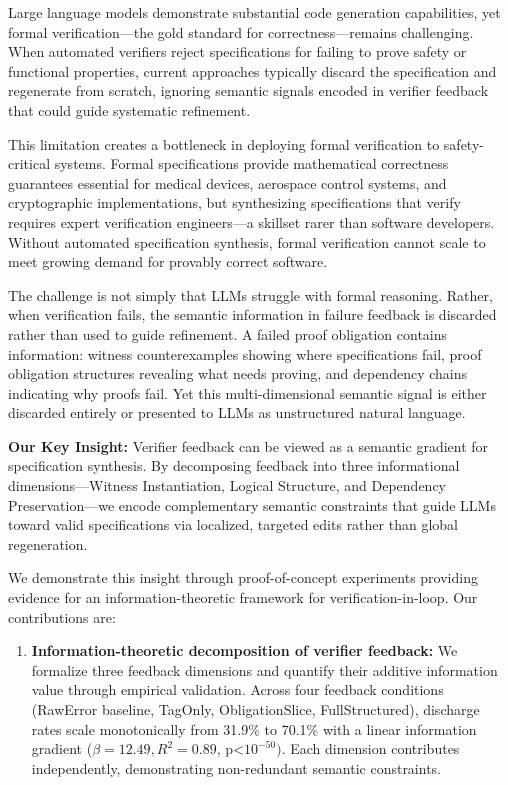 
Large language models demonstrate substantial code generation capabilities, yet formal verification---the gold standard for correctness---remains challenging. When automated verifiers reject specifications for failing to prove safety or functional properties, current approaches typically discard the specification and regenerate from scratch, ignoring semantic signals encoded in verifier feedback that could guide systematic refinement.

This limitation creates a bottleneck in deploying formal verification to safety-critical systems. Formal specifications provide mathematical correctness guarantees essential for medical devices, aerospace control systems, and cryptographic implementations, but synthesizing specifications that verify requires expert verification engineers---a skillset rarer than software developers. Without automated specification synthesis, formal verification cannot scale to meet growing demand for provably correct software.

The challenge is not simply that LLMs struggle with formal reasoning. Rather, when verification fails, the semantic information in failure feedback is discarded rather than used to guide refinement. A failed proof obligation contains information: witness counterexamples showing where specifications fail, proof obligation structures revealing what needs proving, and dependency chains indicating why proofs fail. Yet this multi-dimensional semantic signal is either discarded entirely or presented to LLMs as unstructured natural language.

\textbf{Our Key Insight:} Verifier feedback can be viewed as a semantic gradient for specification synthesis. By decomposing feedback into three informational dimensions---Witness Instantiation, Logical Structure, and Dependency Preservation---we encode complementary semantic constraints that guide LLMs toward valid specifications via localized, targeted edits rather than global regeneration.

We demonstrate this insight through proof-of-concept experiments providing evidence for an information-theoretic framework for verification-in-loop. Our contributions are:

\begin{enumerate}
\item \textbf{Information-theoretic decomposition of verifier feedback:} We formalize three feedback dimensions and quantify their additive information value through empirical validation. Across four feedback conditions (RawError baseline, TagOnly, ObligationSlice, FullStructured), discharge rates scale monotonically from 31.9\% to 70.1\% with a linear information gradient ($\beta =12.49, R^{2}=0.89$, p<$10^{-50})$. Each dimension contributes independently, demonstrating non-redundant semantic constraints.
\end{enumerate}

